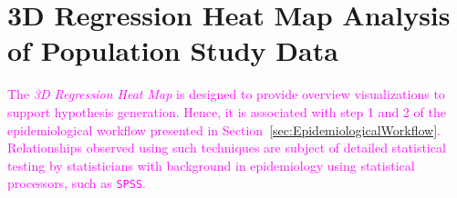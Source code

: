 \documentclass[journal]{style/vgtc} 			          %
\newcommand{\design}[1]{\textcolor{orange}{#1}}
\newcommand{\magenta}[1]{\textcolor{magenta}{#1}}
\begin{document}
\section{3D Regression Heat Map Analysis of Population Study Data}
\magenta{
The \emph{3D Regression Heat Map} is designed to provide overview visualizations to support hypothesis generation.
Hence, it is associated with step 1 and 2 of the epidemiological workflow presented in Section~\ref{sec:EpidemiologicalWorkflow}.
Relationships observed using such techniques are subject of detailed statistical testing by statisticians with background in epidemiology using statistical processors, such as \texttt{SPSS}.
}
\end{document}
